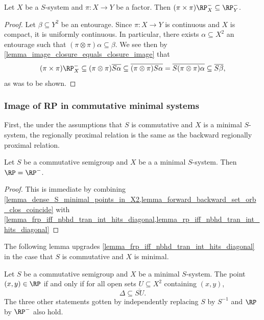 \begin{lemma}
    \label{lemma_rp_functorial_property}
    \leanok{}
    Let $X$ be a $S$-system and $\pi: X \to Y$ be a factor.  Then $(\pi \times \pi) \RP^-_X \subseteq \RP^-_Y$.
\end{lemma}

\begin{proof}
\leanok{}
    Let $\beta \subseteq Y^2$ be an entourage.  Since $\pi: X \to Y$ is continuous and $X$ is compact, it is uniformly continuous.  In particular, there exists $\alpha \subseteq X^2$ an entourage such that $(\pi \otimes \pi) \alpha \subseteq \beta$.  We see then by \cref{lemma_image_closure_equals_closure_image} that
    \[
        (\pi \times \pi) \RP^-_X \subseteq (\pi \otimes \pi) \overline{S \alpha} \subseteq \overline{(\pi \otimes \pi) S \alpha} = \overline{S(\pi \otimes \pi) \alpha} \subseteq \overline{S \beta},\]
    as was to be shown.
\end{proof}

\subsubsection{Image of RP in commutative minimal systems}

First, the under the assumptions that $S$ is commutative and $X$ is a minimal $S$-system, the regionally proximal relation is the same as the backward regionally proximal relation.

\begin{theorem}
    \label{thm_forward_equals_backward_rp}
    \leanok{}
    Let $S$ be a commutative semigroup and $X$ be a a minimal $S$-system. Then $\RP = \RP^-$.
\end{theorem}

\begin{proof}
    This is immediate by combining \cref{lemma_dense_S_minimal_points_in_X2,lemma_forward_backward_set_orb_clos_coincide} with \cref{lemma_frp_iff_nbhd_tran_int_hits_diagonal,lemma_rp_iff_nbhd_tran_int_hits_diagonal}
\end{proof}

The following lemma upgrades \cref{lemma_frp_iff_nbhd_tran_int_hits_diagonal} in the case that $S$ is commutative and $X$ is minimal.

\begin{lemma}
\label{lemma_frp_iff_nbhd_tran_int_contains_diagonal}
\label{lemma_rp_iff_nbhd_tran_int_contains_diagonal}
    Let $S$ be a commutative semigroup and $X$ be a minimal $S$-system.  The point $(x,y) \in \RP$ if and only if for all open sets $U \subseteq X^2$ containing $(x,y)$,
    \[\Delta \subseteq \overline{S U}.\]
    The three other statements gotten by independently replacing $S$ by $S^{-1}$ and $\RP$ by $\RP^-$ also hold.
\end{lemma}

